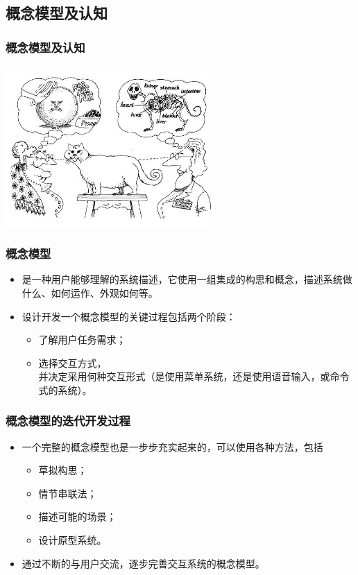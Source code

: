 \documentclass{beamer}
\begin{document}
\subsection{概念模型及认知}
\begin{frame}
	\frametitle{概念模型及认知}
	\begin{center}
		\includegraphics[width=8cm]{images/viewpoint.jpg}
	\end{center}
\end{frame}

\begin{frame}
	\frametitle{概念模型}
	\beamertemplatetransparentcovereddynamicmedium
	\begin{itemize}
		\item 是一种用户能够理解的系统描述，它使用一组集成的构思和概念，描述系统做什么、如何运作、外观如何等。\pause
		\item 设计开发一个概念模型的关键过程包括两个阶段：
		\begin{itemize}
			\item 了解用户任务需求；
			\item 选择交互方式，\\{\tiny 并决定采用何种交互形式（是使用菜单系统，还是使用语音输入，或命令式的系统）。}
		\end{itemize}
	\end{itemize}
\end{frame}

\begin{frame}
	\frametitle{概念模型的迭代开发过程}
	\beamertemplatetransparentcovereddynamicmedium
	\begin{itemize}
		\item 一个完整的概念模型也是一步步充实起来的，可以使用各种方法，包括
		\begin{itemize}
			\item 草拟构思；
			\item 情节串联法；
			\item 描述可能的场景；
			\item 设计原型系统。
		\end{itemize}\pause
		\item 通过不断的与用户交流，逐步完善交互系统的概念模型。
	\end{itemize}
\end{frame}
\end{document}

